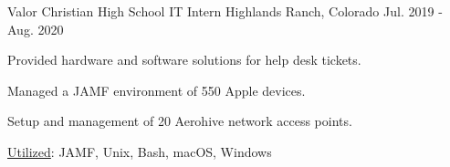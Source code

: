 \begin{cventries}
  \cventry
    {Valor Christian High School} %
    {IT Intern} %
    {Highlands Ranch, Colorado} %
    {Jul. 2019 - Aug. 2020} %
    {
      \begin{cvitems} %
        \item {Provided hardware and software solutions for help desk tickets.}
        \item {Managed a JAMF environment of 550 Apple devices.}
        \item {Setup and management of 20 Aerohive network access points.}
        \item {\underline{Utilized}:  JAMF, Unix, Bash, macOS, Windows}
      \end{cvitems}
    }

\end{cventries}
